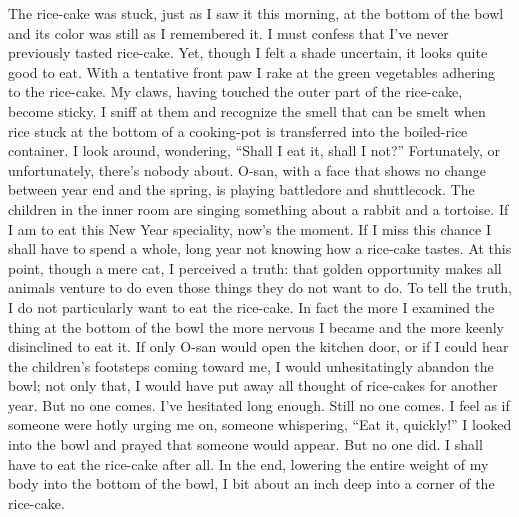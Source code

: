 \documentclass{book}
\begin{document}
The rice-cake was stuck, just as I saw it this morning, at the bottom of
the bowl and its color was still as I remembered it. I must confess that
I've never previously tasted rice-cake. Yet, though I felt a shade
uncertain, it looks quite good to eat. With a tentative front paw I rake
at the green vegetables adhering to the rice-cake. My claws, having
touched the outer part of the rice-cake, become sticky. I sniff at them
and recognize the smell that can be smelt when rice stuck at the bottom
of a cooking-pot is transferred into the boiled-rice container. I look
around, wondering, ``Shall I eat it, shall I not?'' Fortunately, or
unfortunately, there's nobody about. O-san, with a face that shows no
change between year end and the spring, is playing battledore and
shuttlecock. The children in the inner room are singing something about
a rabbit and a tortoise. If I am to eat this New Year speciality, now's
the moment. If I miss this chance I shall have to spend a whole, long
year not knowing how a rice-cake tastes. At this point, though a mere
cat, I perceived a truth: that golden opportunity makes all animals
venture to do even those things they do not want to do. To tell the
truth, I do not particularly want to eat the rice-cake. In fact the more
I examined the thing at the bottom of the bowl the more nervous I became
and the more keenly disinclined to eat it. If only O-san would open the
kitchen door, or if I could hear the children's footsteps coming toward
me, I would unhesitatingly abandon the bowl; not only that, I would have
put away all thought of rice-cakes for another year. But no one comes.
I've hesitated long enough. Still no one comes. I feel as if someone
were hotly urging me on, someone whispering, ``Eat it, quickly!'' I
looked into the bowl and prayed that someone would appear. But no one
did. I shall have to eat the rice-cake after all. In the end, lowering
the entire weight of my body into the bottom of the bowl, I bit about an
inch deep into a corner of the rice-cake.
\end{document}
